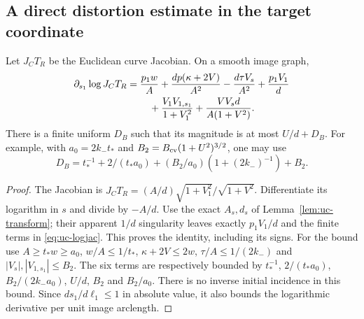 \subsection{A direct distortion estimate in the target coordinate}
\begin{lemma}\label{lem:uc-logjac}
Let $J_C T_R$ be the Euclidean curve Jacobian. On a smooth image graph,
\begin{align}
 \partial_{s_1}\log J_C T_R
 &=\frac{p_1w}{A}+\frac{dp(\kappa+2V)}{A^2}
       -\frac{d\tau V_s}{A^2}+\frac{p_1V_1}{d}\notag\\
 &\hspace{8mm}+\frac{V_1 V_{1,s_1}}{1+V_1^2}
       +\frac{VV_s d}{A(1+V^2)}.\label{eq:uc-logjac}
\end{align}
There is a finite uniform $D_B$ such that its magnitude is at most
$U/d+D_B$. For example, with $a_0=2k_-t_*$ and
$B_2=B_{\rm cv}(1+U^2)^{3/2}$, one may use
\begin{equation}\label{eq:uc-DB}
 D_B=t_*^{-1}+2/(t_*a_0)
                 +(B_2/a_0)(1+(2k_-)^{-1})+B_2.
\end{equation}
\end{lemma}
\begin{proof}
The Jacobian is
$J_C T_R=(A/d)\sqrt{1+V_1^2}/\sqrt{1+V^2}$.
Differentiate its logarithm in $s$ and divide by $-A/d$.
Use the exact $A_s,d_s$ of Lemma~\ref{lem:uc-transform}; their apparent
$1/d$ singularity leaves exactly $p_1V_1/d$ and the finite terms in
\eqref{eq:uc-logjac}. This proves the identity, including its signs.
For the bound use $A\ge t_*w\ge a_0$, $w/A\le1/t_*$,
$\kappa+2V\le2w$, $\tau/A\le1/(2k_-)$ and
$|V_s|,|V_{1,s_1}|\le B_2$. The six terms are respectively bounded
by $t_*^{-1}$, $2/(t_*a_0)$, $B_2/(2k_-a_0)$, $U/d$,
$B_2$ and $B_2/a_0$. There is no inverse initial incidence in this
bound. Since $ds_1/d\ell_1\le1$ in absolute value, it also bounds
the logarithmic derivative per unit image arclength.
\end{proof}

